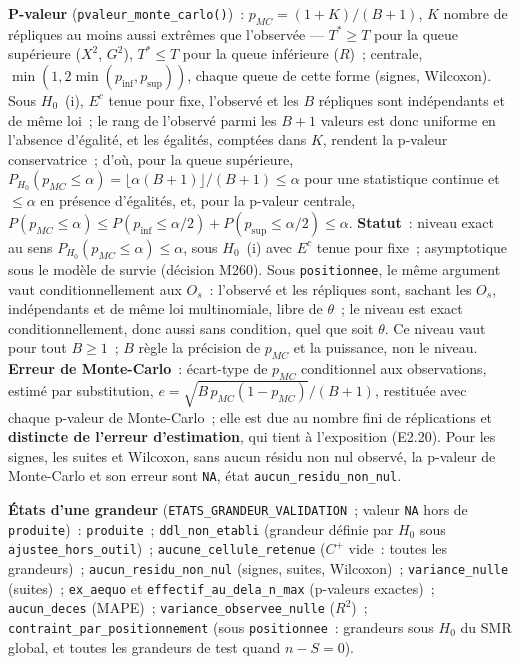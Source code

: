 \documentclass[a4paper,11pt]{article}
\newcommand{\code}[1]{\texttt{\small #1}}
\begin{document}
\medskip
\textbf{P-valeur} (\code{pvaleur\_monte\_carlo()})~: $p_{MC} = (1 + K)/(B +
1)$, $K$ nombre de répliques au moins aussi extrêmes que l'observée ---
$T^{*} \ge T$ pour la queue supérieure ($X^2$, $G^2$), $T^{*} \le T$ pour
la queue inférieure ($R$)~; centrale, $\min(1, 2\min(p_{\inf}, p_{\sup}))$,
chaque queue de cette forme (signes, Wilcoxon). Sous $H_0$~(i), $E^c$
tenue pour fixe, l'observé et les $B$ répliques sont indépendants et de
même loi~; le rang de l'observé parmi les $B + 1$ valeurs est donc
uniforme en l'absence d'égalité, et les égalités, comptées dans $K$, rendent la
p-valeur conservatrice~; d'où, pour la
queue supérieure, $P_{H_0}(p_{MC} \le \alpha) = \lfloor \alpha(B+1)
\rfloor / (B+1) \le \alpha$ pour une statistique continue et $\le \alpha$
en présence d'égalités, et, pour la p-valeur centrale, $P(p_{MC} \le
\alpha) \le P(p_{\inf} \le \alpha/2) + P(p_{\sup} \le \alpha/2) \le \alpha$.
\textbf{Statut}~: niveau exact au sens $P_{H_0}(p_{MC} \le \alpha) \le
\alpha$, sous $H_0$~(i) avec $E^c$ tenue pour fixe~; asymptotique sous le
modèle de survie (décision M260). Sous \code{positionnee}, le même
argument vaut conditionnellement aux $O_s$~: l'observé et les répliques
sont, sachant les $O_s$, indépendants et de même loi multinomiale, libre
de $\theta$~; le niveau est exact conditionnellement, donc aussi sans
condition, quel que soit $\theta$. Ce niveau vaut pour tout $B \ge 1$~; $B$
règle la précision de $p_{MC}$ et la puissance, non le niveau.
\textbf{Erreur de Monte-Carlo}~: écart-type de $p_{MC}$ conditionnel aux
observations, estimé par substitution, $e = \sqrt{B\,p_{MC}(1 - p_{MC})}/(B +
1)$, restituée avec chaque p-valeur de Monte-Carlo~; elle est due au nombre
fini de réplications et \textbf{distincte de l'erreur d'estimation}, qui
tient à l'exposition (E2.20). Pour les signes, les suites et Wilcoxon, sans
aucun résidu non nul observé, la p-valeur de Monte-Carlo et son erreur sont
\code{NA}, état \code{aucun\_residu\_non\_nul}.

\medskip
{\sloppy\noindent
\textbf{États d'une grandeur} (\code{ETATS\_GRANDEUR\_VALIDATION}~; valeur
\code{NA} hors de \code{produite})~: \code{produite}~;
\code{ddl\_non\_etabli} (grandeur définie par $H_0$ sous
\code{ajustee\_hors\_outil})~; \code{aucune\_cellule\_retenue} ($C^{+}$
vide~: toutes les grandeurs)~; \code{aucun\_residu\_non\_nul} (signes,
suites, Wilcoxon)~; \code{variance\_nulle} (suites)~; \code{ex\_aequo} et
\code{effectif\_au\_dela\_n\_max} (p-valeurs exactes)~;
\code{aucun\_deces} (MAPE)~; \code{variance\_observee\_nulle} ($R^2$)~;
\code{contraint\_par\_positionnement} (sous \code{positionnee}~: grandeurs
sous $H_0$ du SMR global, et toutes les grandeurs de test quand $n - S =
0$).\par}
\end{document}

